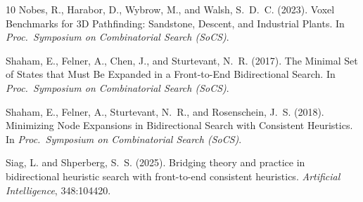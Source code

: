 \documentclass[11pt]{article}
\begin{document}
\begin{thebibliography}{10}
Nobes, R., Harabor, D., Wybrow, M., and Walsh, S.~D.~C. (2023).
\newblock Voxel Benchmarks for 3D Pathfinding: Sandstone, Descent, and
  Industrial Plants.
\newblock In \emph{Proc.\ Symposium on Combinatorial Search (SoCS)}.

Shaham, E., Felner, A., Chen, J., and Sturtevant, N.~R. (2017).
\newblock The Minimal Set of States that Must Be Expanded in a Front-to-End
  Bidirectional Search.
\newblock In \emph{Proc.\ Symposium on Combinatorial Search (SoCS)}.

Shaham, E., Felner, A., Sturtevant, N.~R., and Rosenschein, J.~S. (2018).
\newblock Minimizing Node Expansions in Bidirectional Search with Consistent
  Heuristics.
\newblock In \emph{Proc.\ Symposium on Combinatorial Search (SoCS)}.

Siag, L. and Shperberg, S.~S. (2025).
\newblock Bridging theory and practice in bidirectional heuristic search with
  front-to-end consistent heuristics.
\newblock \emph{Artificial Intelligence}, 348:104420.

\end{thebibliography}
\end{document}
